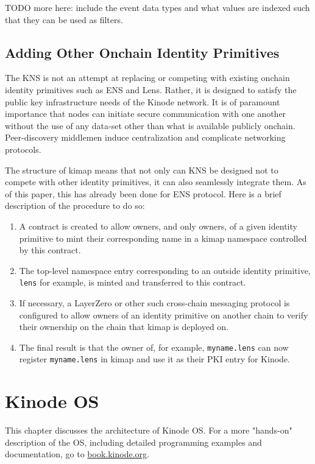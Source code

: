 \documentclass[runningheads]{llncs}
\begin{document}
TODO more here: include the event data types and what values are indexed such that they can be used as filters.

\subsection{Adding Other Onchain Identity Primitives}

The KNS is not an attempt at replacing or competing with existing onchain identity primitives such as ENS and Lens.
Rather, it is designed to satisfy the public key infrastructure needs of the Kinode network.
It is of paramount importance that nodes can initiate secure communication with one another without the use of any data-set other than what is available publicly onchain.
Peer-discovery middlemen induce centralization and complicate networking protocols.

The structure of kimap means that not only can KNS be designed not to compete with other identity primitives, it can also seamlessly integrate them.
As of this paper, this has already been done for ENS protocol.
Here is a brief description of the procedure to do so:
\begin{enumerate}
    \item A contract is created to allow owners, and only owners, of a given identity primitive to mint their corresponding name in a kimap namespace controlled by this contract.
    \item The top-level namespace entry corresponding to an outside identity primitive, \verb|lens| for example, is minted and transferred to this contract.
    \item If necessary, a LayerZero or other such cross-chain messaging protocol is configured to allow owners of an identity primitive on another chain to verify their ownership on the chain that kimap is deployed on.
    \item The final result is that the owner of, for example, \verb|myname.lens| can now register \verb|myname.lens| in kimap and use it as their PKI entry for Kinode.
\end{enumerate}

%
%
%
\section{Kinode OS}

This chapter discusses the architecture of Kinode OS. For a more "hands-on" description of the OS, including detailed programming examples and documentation, go to \href{https://book.kinode.org/}{book.kinode.org}.
\end{document}

